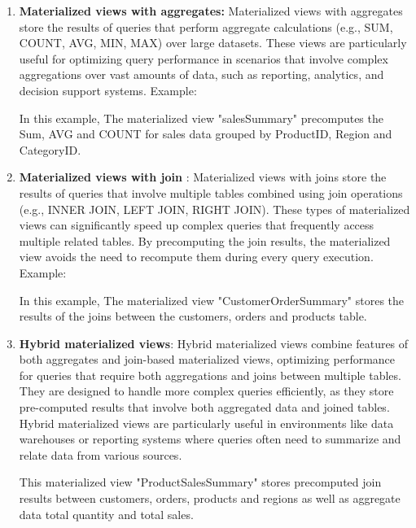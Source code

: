 \begin{enumerate}[label=\alph*)]
    \item \textbf{Materialized views with aggregates:} Materialized views with aggregates store the results of queries that perform aggregate calculations (e.g., SUM, COUNT, AVG, MIN, MAX) over large datasets. These views are particularly useful for optimizing query performance in scenarios that involve complex aggregations over vast amounts of data, such as reporting, analytics, and decision support systems. Example:\vspace{.4cm}
    
    

    In this example, The materialized view "salesSummary" precomputes the Sum, AVG and COUNT for sales data grouped by ProductID, Region and CategoryID.

    \item \textbf{Materialized views with join }: Materialized views with joins store the results of queries that involve multiple tables combined using join operations (e.g., INNER JOIN, LEFT JOIN, RIGHT JOIN). These types of materialized views can significantly speed up complex queries that frequently access multiple related tables. By precomputing the join results, the materialized view avoids the need to recompute them during every query execution. Example: \vspace{.4cm}
    
    

    In this example, The materialized view "CustomerOrderSummary"
    stores the results of the joins between the customers, orders and products table.
    
    \item \textbf{Hybrid materialized views}: Hybrid materialized views combine features of both aggregates and join-based materialized views, optimizing performance for queries that require both aggregations and joins between multiple tables. They are designed to handle more complex queries efficiently, as they store pre-computed results that involve both aggregated data and joined tables. Hybrid materialized views are particularly useful in environments like data warehouses or reporting systems where queries often need to summarize and relate data from various sources. \vspace{.4cm}
    
     
    
This materialized view "ProductSalesSummary" stores precomputed join results between customers, orders, products and regions as well as aggregate data total quantity and total sales.
    
\end{enumerate}

